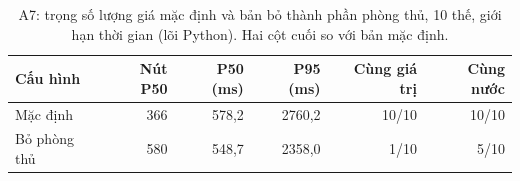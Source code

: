 \begin{table}[H]
  \centering\small
  \caption{A7: trọng số lượng giá mặc định và bản bỏ thành phần phòng thủ, 10 thế, giới hạn thời gian (lõi Python). Hai cột cuối so với bản mặc định.}
  \label{tab:a7}
  \setlength{\tabcolsep}{4pt}
  \begin{tabular}{@{}lrrrrr@{}}
    \toprule
    Cấu hình & Nút P50 & P50 (ms) & P95 (ms) & Cùng giá trị & Cùng nước \\
    \midrule
    Mặc định & 366 & 578{,}2 & 2760{,}2 & 10/10 & 10/10 \\
    Bỏ phòng thủ & 580 & 548{,}7 & 2358{,}0 & 1/10 & 5/10 \\
    \bottomrule
  \end{tabular}
\end{table}
